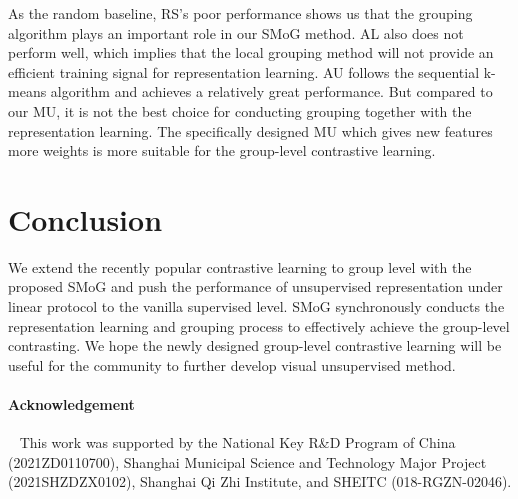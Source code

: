 \documentclass[runningheads]{style/llncs}
\begin{document}
As the random baseline, RS's poor performance shows us that the grouping algorithm plays an important role in our SMoG method. AL also does not perform well, which implies that the local grouping method will not provide an efficient training signal for representation learning. AU follows the sequential k-means algorithm and achieves a relatively great performance. But compared to our MU, it is not the best choice for conducting grouping together with the representation learning. The specifically designed MU which gives new features more weights is more suitable for the group-level contrastive learning.

\section{Conclusion}
We extend the recently popular contrastive learning to group level with the proposed SMoG and push the performance of unsupervised representation under linear protocol to the vanilla supervised level. SMoG synchronously conducts the representation learning and grouping process to effectively achieve the group-level contrasting. We hope the newly designed group-level contrastive learning will be useful for the community to further develop visual unsupervised method.

\paragraph{Acknowledgement}~ This work was supported by the National Key R\&D Program of China (2021ZD0110700), Shanghai Municipal Science and Technology Major Project (2021SHZDZX0102), Shanghai Qi Zhi Institute, and SHEITC (018-RGZN-02046).

\clearpage


\end{document}
